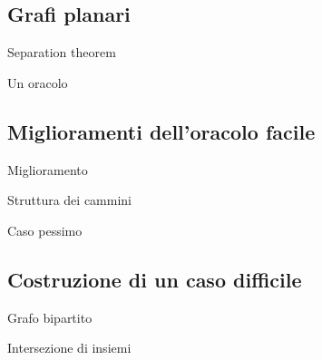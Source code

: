 \documentclass{beamer}
\theoremstyle{plain}
\theoremstyle{definition}
\theoremstyle{remark}
\begin{document}
\subsection{Grafi planari}

\begin{frame}{Separation theorem}
  
\end{frame}

\begin{frame}{Un oracolo}
  
\end{frame}

\subsection{Miglioramenti dell'oracolo facile}

\begin{frame}{Miglioramento}
  
\end{frame}

\begin{frame}{Struttura dei cammini}
  
\end{frame}

\begin{frame}{Caso pessimo}
  
\end{frame}

\subsection{Costruzione di un caso difficile}

\begin{frame}{Grafo bipartito}
  
\end{frame}

\begin{frame}{Intersezione di insiemi}
  
\end{frame}
\end{document}

